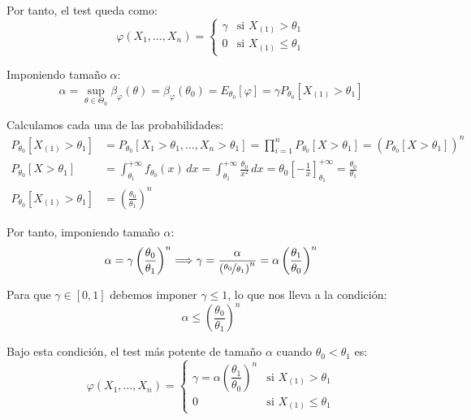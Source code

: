 \begin{ejercicio}
\begin{description}
\begin{description}
            Por tanto, el test queda como:
            \begin{equation*}
                \varphi(X_1, \ldots, X_n) = \left\{\begin{array}{ll}
                    \gamma & \text{si\ } X_{(1)} > \theta_1 \\
                    0 & \text{si\ } X_{(1)} \leq \theta_1
                \end{array}\right.
            \end{equation*}

            Imponiendo tamaño $\alpha$:
            \begin{equation*}
                \alpha = \sup_{\theta \in \Theta_0}\beta_\varphi(\theta) = \beta_\varphi(\theta_0) = E_{\theta_0}[\varphi] = \gamma P_{\theta_0}[X_{(1)} > \theta_1]
            \end{equation*}

            Calculamos cada una de las probabilidades:
            \begin{align*}
                P_{\theta_0}[X_{(1)} > \theta_1] &= P_{\theta_0}[X_1 > \theta_1, \ldots, X_n > \theta_1] = \prod_{i=1}^{n} P_{\theta_0}[X > \theta_1] = \left(P_{\theta_0}[X > \theta_1]\right)^n \\
                P_{\theta_0}[X > \theta_1] &= \int_{\theta_1}^{+\infty} f_{\theta_0}(x)\,dx = \int_{\theta_1}^{+\infty} \frac{\theta_0}{x^2}\,dx = \theta_0 \left[-\frac{1}{x}\right]_{\theta_1}^{+\infty} = \frac{\theta_0}{\theta_1} \\
                P_{\theta_0}[X_{(1)} > \theta_1] &= \left(\frac{\theta_0}{\theta_1}\right)^n
            \end{align*}

            Por tanto, imponiendo tamaño $\alpha$:
            \begin{equation*}
                \alpha = \gamma \left(\frac{\theta_0}{\theta_1}\right)^n \Longrightarrow \gamma = \frac{\alpha}{\left(\nicefrac{\theta_0}{\theta_1}\right)^n} = \alpha\left(\frac{\theta_1}{\theta_0}\right)^n
            \end{equation*}

            Para que $\gamma \in [0,1]$ debemos imponer $\gamma \leq 1$, lo que nos lleva a la condición:
            \begin{equation*}
                \alpha \leq \left(\frac{\theta_0}{\theta_1}\right)^n
            \end{equation*}

            Bajo esta condición, el test más potente de tamaño $\alpha$ cuando $\theta_0 < \theta_1$ es:
            \begin{equation*}
                \varphi(X_1, \ldots, X_n) = \left\{\begin{array}{ll}
                    \gamma = \alpha\left(\dfrac{\theta_1}{\theta_0}\right)^n & \text{si\ } X_{(1)} > \theta_1 \\[8pt]
                    0 & \text{si\ } X_{(1)} \leq \theta_1
                \end{array}\right.
            \end{equation*}


\end{description}
\end{description}
\end{ejercicio}
